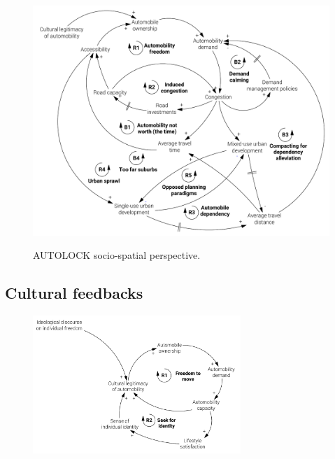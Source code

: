 \begin{figure}
\centering
\includegraphics[width=\textwidth]{figures/model/cropped/congestion-urban_3_final.pdf}
\label{f:results:cld_congestion_3}
\caption[AUTOLOCK socio-spatial perspective: freedom and congestion]{AUTOLOCK socio-spatial perspective.}
\end{figure}

\subsection{Cultural feedbacks}
\label{ss:results:cld_cultural-feedbacks}

\begin{figure}[h]
\centering
\includegraphics[width=0.7\textwidth]{figures/model/cropped/cultural_1_core.pdf}
\label{f:results:cld_culture_1}
\caption[]{}
\end{figure}

